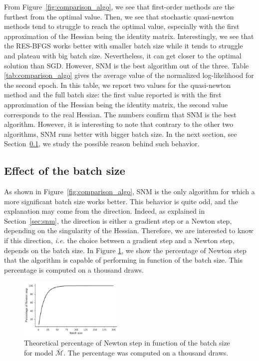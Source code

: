 \documentclass[conference]{IEEEtran}
\begin{document}
From Figure~\ref{fig:comparison_algo}, we see that first-order methods are the furthest from the optimal value. Then, we see that stochastic quasi-newton methods tend to struggle to reach the optimal value, especially with the first approximation of the Hessian being the identity matrix. Interestingly, we see that the RES-BFGS works better with smaller batch size while it tends to struggle and plateau with big batch size. Nevertheless, it can get closer to the optimal solution than SGD. However, SNM is the best algorithm out of the three. Table \ref{tab:comparison_algo} gives the average value of the normalized log-likelihood for the second epoch. In this table, we report two values for the quasi-newton method and the full batch size: the first value reported is with the first approximation of the Hessian being the identity matrix, the second value corresponds to the real Hessian. The numbers confirm that SNM is the best algorithm. However, it is interesting to note that contrary to the other two algorithms, SNM runs better with bigger batch size. In the next section, see Section~\ref{sec:effect_bs}, we study the possible reason behind such behavior.

\subsection{Effect of the batch size}
\label{sec:effect_bs}

As shown in Figure~\ref{fig:comparison_algo}, SNM is the only algorithm for which a more significant batch size works better. This behavior is quite odd, and the explanation may come from the direction. Indeed, as explained in Section~\ref{sec:snm}, the direction is either a gradient step or a Newton step, depending on the singularity of the Hessian. Therefore, we are interested to know if this direction, {\it i.e.} the choice between a gradient step and a Newton step, depends on the batch size. In Figure \ref{fig:perc_newton}, we show the percentage of Newton step that the algorithm is capable of performing in function of the batch size. This percentage is computed on a thousand draws. \\

\begin{figure}[t]
\centering
\includegraphics[width=0.45\textwidth]{../figures/perc_newton.pdf}
\vspace{-0.3cm}
\caption{Theoretical percentage of Newton step in function of the batch size for model $\bar{\mathcal{M}}$. The percentage was computed on a thousand draws.}
\label{fig:perc_newton}
\vspace{-0.3cm}
\end{figure}
\end{document}

